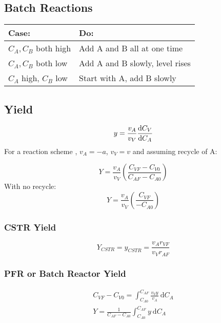 \documentclass[10pt, oneside, twocolumn]{article}
\numberwithin{equation}{section}
\begin{document}
		\subsection{Batch Reactions}
		\begin{table}[h]
			\begin{tabular}{p{}|p{}}
				Case:	&  Do:\\
				\hline
				$C_A, C_B$ both high	&Add A and B all at one time  \\
				$C_A, C_B$ both low	&Add A and B slowly, level rises  \\
				$C_A$ high, $C_B$ low	&Start with A, add B slowly  \\ 
			\end{tabular}
		\end{table}
		\subsection{Yield}
			\begin{equation}
			y=\frac{v_A}{v_V}\frac{\mathrm{d}C_V}{\mathrm{d}C_A}\\
			\end{equation}
			For a reaction scheme , $v_A=-a$, $v_V=v$ and assuming recycle of A:\par
			\begin{equation}
			Y=\frac{v_A}{v_V}\left(\frac{C_{VF}-C_{V0}}{C_{AF}-C_{A0}}\right)
			\end{equation}
			With no recycle:
			\begin{equation}
			Y=\frac{v_A}{v_V}\left(\frac{C_{VF}}{-C_{A0}}\right)
			\end{equation}
			\subsubsection{CSTR Yield}
				\begin{equation}
				Y_{CSTR}=y_{CSTR}=\frac{v_A r_{VF}}{v_V r_{AF}}
				\end{equation}
			\subsubsection{PFR or Batch Reactor Yield}
				\begin{gather}
				C_{VF}-C_{V0}=\int_{C_{A0}}^{C_{AF}}\frac{v_V y}{v_A} \ \mathrm{d}C_A\\
				Y=\frac{1}{C_{AF}-C_{A0}}\int_{C_{A0}}^{C_{AF}}y\ \mathrm{d}C_A
				\end{gather}
\end{document}
